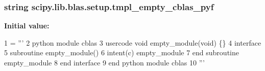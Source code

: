 \subsubsection[{tmpl\+\_\+empty\+\_\+cblas\+\_\+pyf}]{\setlength{\rightskip}{0pt plus 5cm}string scipy.\+lib.\+blas.\+setup.\+tmpl\+\_\+empty\+\_\+cblas\+\_\+pyf}\label{namespacescipy_1_1lib_1_1blas_1_1setup_a9397f7365bc64b629adea4a3b2345fb6}
{\bfseries Initial value\+:}
\begin{DoxyCode}
1 = \textcolor{stringliteral}{'''}
2 \textcolor{stringliteral}{python module cblas}
3 \textcolor{stringliteral}{  usercode void empty\_module(void) \{\}}
4 \textcolor{stringliteral}{  interface}
5 \textcolor{stringliteral}{    subroutine empty\_module()}
6 \textcolor{stringliteral}{      intent(c) empty\_module}
7 \textcolor{stringliteral}{    end subroutine empty\_module}
8 \textcolor{stringliteral}{  end interface}
9 \textcolor{stringliteral}{end python module cblas}
10 \textcolor{stringliteral}{'''}
\end{DoxyCode}
